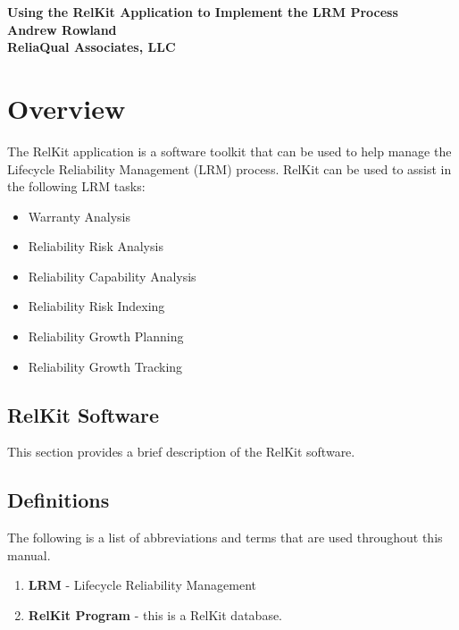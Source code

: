 \documentclass[11pt, 12pt, twoside, onecolumn]{book}
\begin{document}
\selectfont
\normalfont

\captionsetup{labelfont=bf}

\begin{titlepage}
\centering
{\linespread{1.3} \Huge \textbf{Using the RelKit Application to Implement the LRM Process}} \\
\vspace{5in}
{\linespread{1.3} \large \textbf{Andrew Rowland}} \\
{\linespread{1.3} \large \textbf{ReliaQual Associates, LLC}}
\end{titlepage}

\tableofcontents
\newpage

\chapter{Overview}
\FloatBarrier
\noindent The RelKit application is a software toolkit that can be used to help manage the Lifecycle Reliability Management (LRM) process.  RelKit can be used to assist in the following LRM tasks:

	\begin{itemize}
		\item Warranty Analysis
		\item Reliability Risk Analysis
		\item Reliability Capability Analysis
		\item Reliability Risk Indexing
		\item Reliability Growth Planning
		\item Reliability Growth Tracking
	\end{itemize}

\section{RelKit Software}
\FloatBarrier
\noindent This section provides a brief description of the RelKit software.

\section{Definitions}\label{def}
\FloatBarrier
\noindent The following is a list of abbreviations and terms that are used throughout this manual.

	\begin{enumerate}
		\item \textbf{LRM} - Lifecycle Reliability Management
		\item \textbf{RelKit Program} - this is a RelKit database.
	\end{enumerate}
\end{document}
